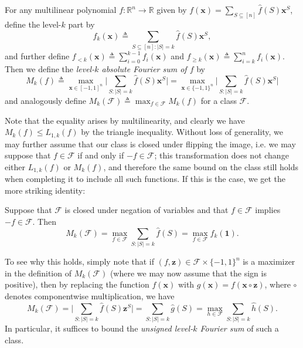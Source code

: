 \begin{definition}
\label{def:mk}
For any multilinear polynomial $f:\mathbb{R}^n\to \mathbb{R}$ given by $f(\mathbf{x})=\sum_{S\subseteq [n]} \hat{f}(S)\mathbf{x}^S$, define the level-$k$ part by
\begin{equation*}
    f_{k}(\mathbf{x})\triangleq\sum_{S\subseteq [n]:\vert S\vert=k} \hat{f}(S)\mathbf{x}^S,
\end{equation*}
and further define $f_{<k}(\mathbf{x})\triangleq \sum_{i=0}^{k-1} f_i(\mathbf{x})$ and $f_{\geq k}(\mathbf{x})\triangleq \sum_{i=k}^{n} f_i(\mathbf{x})$. 
Then we define the \emph{level-$k$ absolute Fourier sum of $f$} by
\begin{equation*}
    M_k(f)\triangleq \max_{\mathbf{x}\in [-1,1]^n}\bigg\vert \sum_{S:\vert S\vert=k} \hat{f}(S)\mathbf{x}^S\bigg\vert =  \max_{\mathbf{x}\in \{-1,1\}^n}\bigg\vert \sum_{S:\vert S\vert=k} \hat{f}(S)\mathbf{x}^S\bigg\vert
\end{equation*}
and analogously define $M_k(\mathcal{F})\triangleq \max_{f\in \mathcal{F}} M_k(f)$ for a class $\mathcal{F}$.
\end{definition}
Note that the equality arises by multilinearity, and clearly we have $M_k(f)\leq L_{1,k}(f)$ by the triangle inequality. Without loss of generality, we may further assume that our class is closed under flipping the image, i.e. we may suppose that $f\in \mathcal{F}$ if and only if $-f\in \mathcal{F}$; this transformation does not change either $L_{1,k}(f)$ or $M_k(f)$, and therefore the same bound on the class still holds when completing it to include all such functions. If this is the case, we get the more striking identity:

\begin{lemma}
\label{lem:unsigned}
Suppose that $\mathcal{F}$ is closed under negation of variables and that $f\in \mathcal{F}$ implies $-f\in \mathcal{F}$. Then
\begin{equation*}
    M_k(\mathcal{F})=\max_{f\in \mathcal{F}} \sum_{S:\vert S\vert = k} \hat{f}(S) = \max_{f \in  \mathcal{F} } f_k \left( \mathbf{1} \right) .
\end{equation*}
\end{lemma}

To see why this holds, simply note that if $(f,\mathbf{z})\in \mathcal{F}\times \{-1,1\}^n$ is a maximizer in the definition of $M_k(\mathcal{F})$ (where we may now assume that the sign is positive), then by replacing the function $f(\mathbf{x})$ with $g(\mathbf{x})=f(\mathbf{x}\circ \mathbf{z})$, where $\circ$ denotes componentwise multiplication, we have 
\begin{equation*}
    M_k(\mathcal{F})
    = \Biggl| \sum_{S:\vert S\vert=k} \hat{f}(S)\mathbf{z}^S \Biggr|
    = \sum_{S:\vert S\vert=k} \hat{g}(S)=\max_{h\in \mathcal{F}} \sum_{S:\vert S\vert=k} \hat{h}(S).
\end{equation*}
In particular, it suffices to bound the \emph{unsigned level-$k$ Fourier sum} of such a class.

